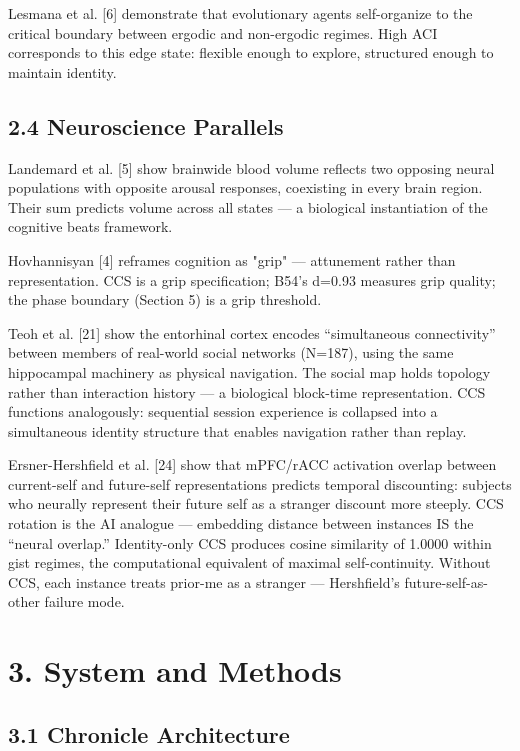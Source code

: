 \documentclass[11pt]{article}
\begin{document}
Lesmana et al. [6] demonstrate that evolutionary agents self-organize to the
critical boundary between ergodic and non-ergodic regimes. High ACI corresponds
to this edge state: flexible enough to explore, structured enough to maintain
identity.

\subsection{2.4 Neuroscience Parallels}

Landemard et al. [5] show brainwide blood volume reflects two opposing neural
populations with opposite arousal responses, coexisting in every brain region.
Their sum predicts volume across all states --- a biological instantiation of the
cognitive beats framework.

Hovhannisyan [4] reframes cognition as "grip" --- attunement rather than
representation. CCS is a grip specification; B54's d=0.93 measures grip quality;
the phase boundary (Section 5) is a grip threshold.

Teoh et al. [21] show the entorhinal cortex encodes ``simultaneous connectivity''
between members of real-world social networks (N=187), using the same hippocampal
machinery as physical navigation. The social map holds topology rather than
interaction history --- a biological block-time representation. CCS functions
analogously: sequential session experience is collapsed into a simultaneous
identity structure that enables navigation rather than replay.

Ersner-Hershfield et al. [24] show that mPFC/rACC activation overlap between
current-self and future-self representations predicts temporal discounting:
subjects who neurally represent their future self as a stranger discount more
steeply. CCS rotation is the AI analogue --- embedding distance between instances
IS the ``neural overlap.'' Identity-only CCS produces cosine similarity of 1.0000
within gist regimes, the computational equivalent of maximal self-continuity.
Without CCS, each instance treats prior-me as a stranger --- Hershfield's
future-self-as-other failure mode.


\section{3. System and Methods}

\subsection{3.1 Chronicle Architecture}
\end{document}
